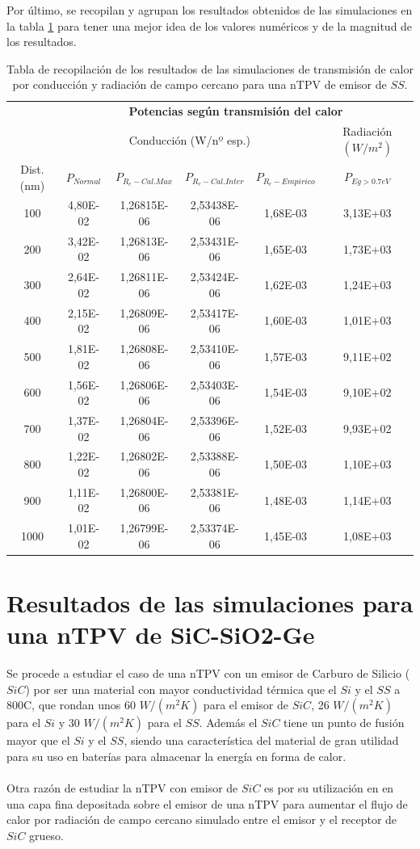 Por último, se recopilan y agrupan los resultados obtenidos de las simulaciones en la tabla \ref{tab:SsSiO2Ge} para tener una mejor idea de los valores numéricos y de la magnitud de los resultados.
\begin{table}[H]
	\centering
		\begin{tabular}{|c||c|c|c|c||c|}
		\hline
		\multirow{2}{*}{ }& \multicolumn{5}{c|}{\textbf{\large Potencias según transmisión del calor}}\\ \cline{2-6}
& \multicolumn{4}{c||}{Conducción (W/nº esp.)}& Radiación $(W/m^2)$\\ \hline
Dist. (nm)&$P_{Normal}$&$P_{R_c-Cal.Max}$&$P_{R_c-Cal.Inter}$&$P_{R_c-Empirico}$&$P_{Eg>0.7eV}$\\ \hline \hline
100&4,80E-02&1,26815E-06&2,53438E-06&1,68E-03&3,13E+03\\ \hline 
200&3,42E-02&1,26813E-06&2,53431E-06&1,65E-03&1,73E+03\\ \hline 
300&2,64E-02&1,26811E-06&2,53424E-06&1,62E-03&1,24E+03\\ \hline 
400&2,15E-02&1,26809E-06&2,53417E-06&1,60E-03&1,01E+03\\ \hline 
500&1,81E-02&1,26808E-06&2,53410E-06&1,57E-03&9,11E+02\\ \hline 
600&1,56E-02&1,26806E-06&2,53403E-06&1,54E-03&9,10E+02\\ \hline 
700&1,37E-02&1,26804E-06&2,53396E-06&1,52E-03&9,93E+02\\ \hline 
800&1,22E-02&1,26802E-06&2,53388E-06&1,50E-03&1,10E+03\\ \hline 
900&1,11E-02&1,26800E-06&2,53381E-06&1,48E-03&1,14E+03\\ \hline 
1000&1,01E-02&1,26799E-06&2,53374E-06&1,45E-03&1,08E+03\\ \hline 
		\end{tabular}
	\caption{Tabla de recopilación de los resultados de las simulaciones de transmisión de calor por conducción y radiación de campo cercano para una nTPV de emisor de $SS$.}
	\label{tab:SsSiO2Ge}
\end{table}
\vfill \newpage
\section{Resultados de las simulaciones para una nTPV de SiC-SiO2-Ge}
Se procede a estudiar el caso de una nTPV con un emisor de Carburo de Silicio ($SiC$) por ser una material con mayor conductividad térmica que el $Si$ y el $SS$ a 800\textdegree C, que rondan unos 60 $W/(m^2 K)$ para el emisor de $SiC$, 26 $W/(m^2 K)$ para el $Si$ y 30 $W/(m^2 K)$ para el $SS$. Además el $SiC$ tiene un punto de fusión mayor que el $Si$ y el $SS$, siendo una característica del material de gran utilidad para su uso en baterías para almacenar la energía en forma de calor.\\\\
Otra razón de estudiar la nTPV con emisor de $SiC$ es por su utilización en \cite{doi:Near_field_ThinFilm} en una capa fina depositada sobre el emisor de una nTPV para aumentar el flujo de calor por radiación de campo cercano simulado entre el emisor y el receptor de $SiC$ grueso.
